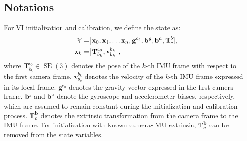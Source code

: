 \subsection{Notations}
For VI initialization and calibration, we define the state as:
\begin{align}
\label{eq:maci2:state}
\mathcal {X}=&\big [ \mathbf {x}_{0},\mathbf {x}_{1},\ldots \mathbf {x}_{n}, \mathbf{g}^{c_{0}}, \mathbf{b}^g, \mathbf{b}^a, \mathbf {T}^{b}_{c}] \notag, \\ \mathbf {x}_{k}=&\big [ \mathbf {T}^{c_{0}}_{b_{k}},\mathbf {v}^{b_{k}}_{b_{k}} \big ],
\end{align}
where $\mathbf{T}^{c_0}_{b_k} \in \operatorname{SE}(3)$ denotes the pose of the $k$-th IMU frame with respect to the first camera frame. $\mathbf{v}^{b_k}_{b_k}$ denotes the velocity of the $k$-th IMU frame expressed in its local frame. $\mathbf{g}^{c_0}$ denotes the gravity vector expressed in the first camera frame. $\mathbf{b}^g$ and $\mathbf{b}^a$ denote the gyroscope and accelerometer biases, respectively, which are assumed to remain constant during the initialization and calibration process. $\mathbf{T^b_c}$ denotes the extrinsic transformation from the camera frame to the IMU frame. For initialization with known camera-IMU extrinsic, $\mathbf{{T}^{b}_{c}}$ can be removed from the state variables.

